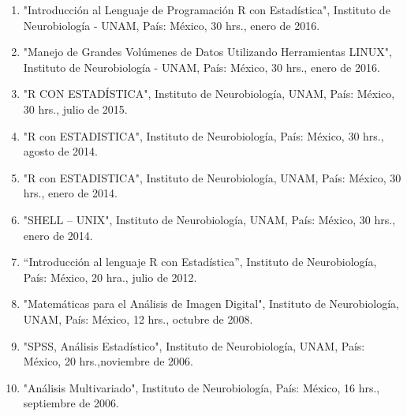 \begin{enumerate}
\item "Introducción al Lenguaje de Programación R con Estadística", Instituto de Neurobiología - UNAM, País: 
México, 30 hrs., enero de 2016.

\item "Manejo de Grandes Volúmenes de Datos Utilizando Herramientas LINUX", Instituto de Neurobiología - 
UNAM, País: México, 30 hrs., enero de 2016.

\item "R CON ESTADÍSTICA", Instituto de Neurobiología, UNAM, País: 
México, 30 hrs., julio de 2015.

\item "R con ESTADISTICA", Instituto de 
Neurobiología, País: México, 30 hrs., agosto de 2014.

\item "R con ESTADISTICA", Instituto de 
Neurobiología, UNAM, País: México, 30 hrs., enero de 2014.

\item "SHELL – UNIX", Instituto de 
Neurobiología, UNAM, País: México, 30 hrs., enero de 2014.

\item “Introducción al lenguaje R con Estadística”, Instituto de Neurobiología, País: México, 20 hra., julio de 2012.

\item "Matemáticas para el Análisis de Imagen Digital", Instituto de Neurobiología, UNAM, País: México, 12 hrs., 
octubre de 2008.

\item "SPSS, Análisis Estadístico", Instituto de Neurobiología, UNAM, País: México, 20 
hrs.,noviembre de 2006.

\item "Análisis Multivariado", Instituto de Neurobiología, País: México, 16 hrs., septiembre de 2006.

\end{enumerate}

